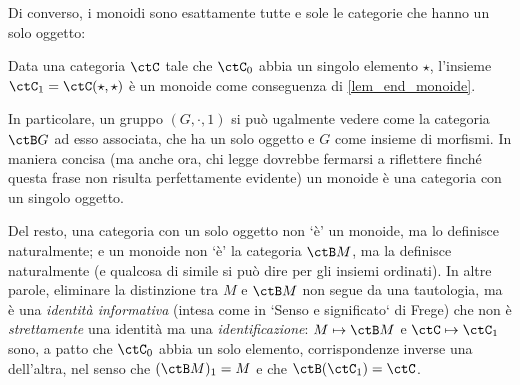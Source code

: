 Di converso, i monoidi sono esattamente tutte e sole le categorie che hanno un solo oggetto:
\begin{theorem}\label{cat_sonomon}
	Data una categoria \(\ctC\) tale che \(\ctC_0\) abbia un singolo elemento \(\star\), l'insieme \(\ctC_1 = \Hom{\ctC}(\star,\star)\) è un monoide come conseguenza di \ref{lem_end_monoide}.
\end{theorem}
%
%
\begin{corollary}\label{cor_cat_mon}
	In particolare, un gruppo \((G,\cdot,1)\) si può ugalmente vedere come la categoria \(\ctB G\) ad esso associata, che ha un solo oggetto e \(G\) come insieme di morfismi. In maniera concisa (ma anche ora, chi legge dovrebbe fermarsi a riflettere finché questa frase non risulta perfettamente evidente) un monoide è una categoria con un singolo oggetto.%
\end{corollary}
\begin{remark}
	Del resto, una categoria con un solo oggetto non `è' un monoide, ma lo definisce naturalmente; e un monoide non `è' la categoria \(\ctB M\), ma la definisce naturalmente (e qualcosa di simile si può dire per gli insiemi ordinati). In altre parole, eliminare la distinzione tra \(M\) e \(\ctB M\) non segue da una tautologia, ma è una \emph{identità informativa} (intesa come in `Senso e significato` di Frege) che non è \emph{strettamente} una identità ma una \emph{identificazione}: \(M\mapsto \ctB M\) e \(\ctC\mapsto \ctC_1\) sono, a patto che \(\ctC_0\) abbia un solo elemento, corrispondenze inverse una dell'altra, nel senso che \((\ctB M)_1 = M\) e che \(\ctB(\ctC_1) = \ctC\).
\end{remark}
